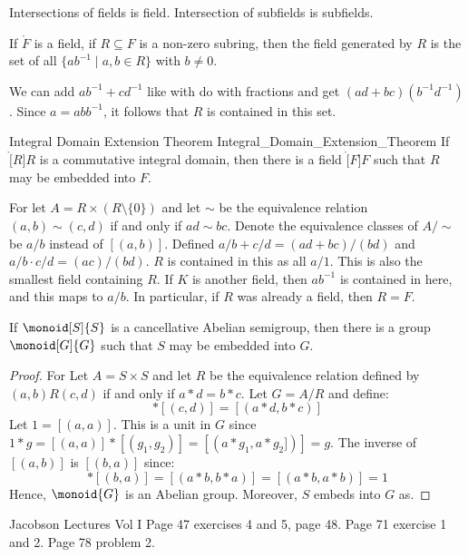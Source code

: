             Intersections of fields is field. Intersection of subfields is
            subfields.
            \begin{theorem}
                If $\ring{F}$ is a field, if $R\subseteq{F}$ is a non-zero
                subring, then the field generated by $R$ is the set of all
                $\{ab^{\minus{1}}\;|\;a,b\in{R}\}$ with $b\ne{0}$.
            \end{theorem}
            We can add $ab^{\minus{1}}+cd^{\minus{1}}$ like with do with
            fractions and get $(ad+bc)(b^{\minus{1}}d^{\minus{1}})$.
            Since $a=abb^{\minus{1}}$, it follows that $R$ is contained in
            this set.
            \begin{ftheorem}{Integral Domain Extension Theorem}
                            {Integral_Domain_Extension_Theorem}
                If $\ring[R]{R}$ is a commutative integral domain, then
                there is a field $\ring[F]{F}$ such that $R$ may be
                embedded into $F$.
            \end{ftheorem}
            \begin{bproof}
                For let $A=R\times(R\setminus\{0\})$ and let $\sim$ be the
                equivalence relation $(a,b)\sim(c,d)$ if and only if
                $ad\sim{b}c$. Denote the equivalence classes of
                $A/\sim$ be $a/b$ instead of $[(a,b)]$. Defined
                $a/b+c/d=(ad+bc)/(bd)$ and $a/b\cdot{c}/d=(ac)/(bd)$.
                $R$ is contained in this as all $a/1$. This is also the
                smallest field containing $R$. If $K$ is another field,
                then $ab^{\minus{1}}$ is contained in here, and this maps
                to $a/b$. In particular, if $R$ was already a field, then
                $R=F$.
            \end{bproof}
            \begin{theorem}
                If $\monoid[S]{S}$ is a cancellative Abelian semigroup, then
                there is a group $\monoid[G]{G}$ such that $S$ may be
                embedded into $G$.
            \end{theorem}
            \begin{proof}
                For Let $A=S\times{S}$ and let $R$ be the equivalence
                relation defined by $(a,b)R(c,d)$ if and only if
                $a*d=b*c$. Let $G=A/R$ and define:
                \begin{equation}
                    [(a,b)]*[(c,d)]=[(a*d,b*c)]
                \end{equation}
                Let $1=[(a,a)]$. This is a unit in $G$ since
                $1*g=[(a,a)]*[(g_{1},g_{2})]=[(a*g_{1},a*g_{2}])]=g$.
                The inverse of $[(a,b)]$ is $[(b,a)]$ since:
                \begin{equation}
                    [(a,b)]*[(b,a)]=[(a*b,b*a)]=[(a*b,a*b)]=1
                \end{equation}
                Hence, $\monoid{G}$ is an Abelian group. Moreover, $S$
                embeds into $G$ as.
            \end{proof}
\par\hfill\par
Jacobson Lectures Vol I Page 47 exercises 4 and 5, page 48. Page 71
exercise 1 and 2. Page 78 problem 2.